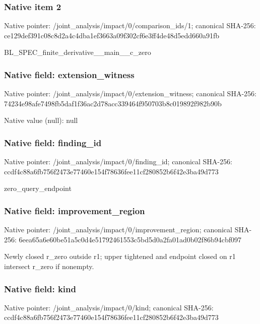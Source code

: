 \documentclass[10pt,a4paper]{article}
\begin{document}
\subsubsection{Native item 2}
Native pointer: /joint\_\allowbreak{}analysis/impact/0/comparison\_\allowbreak{}ids/1; canonical SHA-256: ce129def391c08c8d2a4c4dba1ef3663a09f302cf6e3ff4de48d5edd660a91fb

\begingroup\raggedright\sloppy BL\_\allowbreak{}SPEC\_\allowbreak{}finite\_\allowbreak{}derivative\_\allowbreak{}\_\allowbreak{}main\_\allowbreak{}\_\allowbreak{}c\_\allowbreak{}zero\par\endgroup

\subsubsection{Native field: extension\_\allowbreak{}witness}
Native pointer: /joint\_\allowbreak{}analysis/impact/0/extension\_\allowbreak{}witness; canonical SHA-256: 74234e98afe7498fb5daf1f36ac2d78acc339464f950703b8c019892f982b90b

Native value (null): null

\subsubsection{Native field: finding\_\allowbreak{}id}
Native pointer: /joint\_\allowbreak{}analysis/impact/0/finding\_\allowbreak{}id; canonical SHA-256: ccdf4c88a6fb756f2473e77460e154f78636fee11cf280852b6f42e3ba49d773

\begingroup\raggedright\sloppy zero\_\allowbreak{}query\_\allowbreak{}endpoint\par\endgroup

\subsubsection{Native field: improvement\_\allowbreak{}region}
Native pointer: /joint\_\allowbreak{}analysis/impact/0/improvement\_\allowbreak{}region; canonical SHA-256: 6eea65a6e60be51a5c0d4e51792461553c5bd5d0a2fa01ad0b02f86b94cbf097

\begingroup\raggedright\sloppy Newly closed r\_\allowbreak{}zero outside r1;\allowbreak{} upper tightened and endpoint closed on r1 intersect r\_\allowbreak{}zero if nonempty.\par\endgroup

\subsubsection{Native field: kind}
Native pointer: /joint\_\allowbreak{}analysis/impact/0/kind; canonical SHA-256: ccdf4c88a6fb756f2473e77460e154f78636fee11cf280852b6f42e3ba49d773
\end{document}
